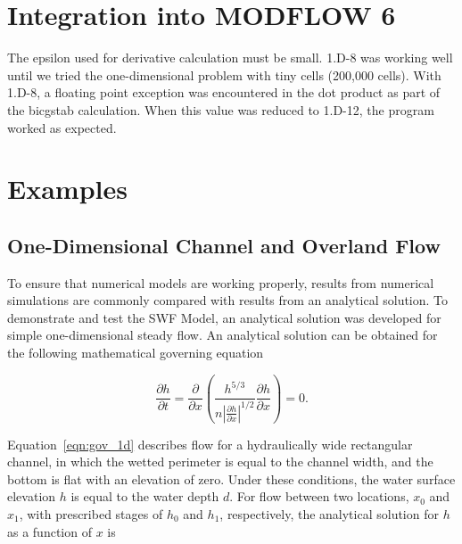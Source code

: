 \documentclass[fleqn]{article}
\begin{document}
\section{Integration into MODFLOW 6}

The epsilon used for derivative calculation must be small.  1.D-8 was working well until we tried the one-dimensional problem with tiny cells (200,000 cells).  With 1.D-8, a floating point exception was encountered in the dot product as part of the bicgstab calculation.  When this value was reduced to 1.D-12, the program worked as expected.

\section{Examples}


\subsection{One-Dimensional Channel and Overland Flow}

To ensure that numerical models are working properly, results from numerical simulations are commonly compared with results from an analytical solution.  To demonstrate and test the SWF Model, an analytical solution was developed for simple one-dimensional steady flow.  An analytical solution can be obtained for the following mathematical governing equation

\begin{equation}
  \frac{\partial h}{\partial t} = \frac{\partial}{\partial x} 
  \left ( \frac{h^{5/3}}{n \left | \frac{\partial h}{\partial x} \right |^{1/2}} 
  \frac{\partial h}{\partial x} \right ) = 0 .
  \label{eqn:gov_1d}
\end{equation}

\noindent Equation~\ref{eqn:gov_1d} describes flow for a hydraulically wide rectangular channel, in which the wetted perimeter is equal to the channel width, and the bottom is flat with an elevation of zero.  Under these conditions, the water surface elevation $h$ is equal to the water depth $d$.  For flow between two locations, $x_0$ and $x_1$, with prescribed stages of $h_0$ and $h_1$, respectively, the analytical solution for $h$ as a function of $x$ is
\end{document}
